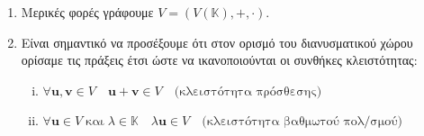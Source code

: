 \begin{rem}
\item {}
    \begin{enumerate}
        \item Μερικές φορές γράφουμε $V = (V(\mathbb{K}), +, \cdot) $.
        \item Είναι σημαντικό να προσέξουμε ότι στον ορισμό του διανυσματικού χώρου 
            ορίσαμε τις πράξεις έτσι ώστε να ικανοποιούνται οι συνθήκες κλειστότητας:
            \begin{enumerate}[i)]
                \item $ \forall \mathbf{u}, \mathbf{v} \in V \quad \mathbf{u} + \mathbf{v} \in V \quad
                    \text{(κλειστότητα πρόσθεσης)} $ 
                \item $ \forall \mathbf{u} \in V \; \text{και} \; \lambda \in \mathbb{K} \quad \lambda
                    \mathbf{u} \in V \quad \text{(κλειστότητα βαθμωτού πολ/σμού)} $
            \end{enumerate}
    \end{enumerate}
\end{rem}


